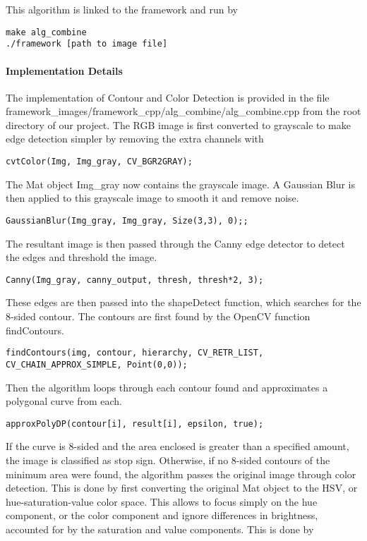 \documentclass[letterpaper,10pt,titlepage]{article}
\begin{document}
This algorithm is linked to the framework and run by

\begin{lstlisting}
make alg_combine
./framework [path to image file]
\end{lstlisting}

\paragraph{Implementation Details}
The implementation of Contour and Color Detection is provided in the file 
framework\_images/framework\_cpp/alg\_combine/alg\_combine.cpp from the root 
directory of our project. The RGB image is first converted to grayscale to make
edge detection simpler by removing the extra channels with 

\begin{lstlisting}
cvtColor(Img, Img_gray, CV_BGR2GRAY);
\end{lstlisting}

The Mat object Img\_gray now contains the grayscale image. A Gaussian Blur is
then applied to this grayscale image to smooth it and remove noise. 

\begin{lstlisting}
GaussianBlur(Img_gray, Img_gray, Size(3,3), 0);;
\end{lstlisting}

The resultant image is then passed through the Canny edge detector to detect 
the edges and threshold the image. 

\begin{lstlisting}
Canny(Img_gray, canny_output, thresh, thresh*2, 3);
\end{lstlisting}

These edges are then passed into the shapeDetect function, which searches for 
the 8-sided contour. The contours are first found by the OpenCV function 
findContours.

\begin{lstlisting}
findContours(img, contour, hierarchy, CV_RETR_LIST, CV_CHAIN_APPROX_SIMPLE, Point(0,0));
\end{lstlisting}

Then the algorithm loops through each contour found and approximates a 
polygonal curve from each.

\begin{lstlisting}
approxPolyDP(contour[i], result[i], epsilon, true);
\end{lstlisting}

If the curve is 8-sided and the area enclosed is greater than a specified
amount, the image is classified as stop sign. Otherwise, if no 8-sided contours
of the minimum area were found, the algorithm passes the original image through
color detection. This is done by first converting the original Mat object to
the HSV, or hue-saturation-value color space. This allows to focus simply on 
the hue component, or the color component and ignore differences in brightness,
accounted for by the saturation and value components. This is done by
\end{document}

